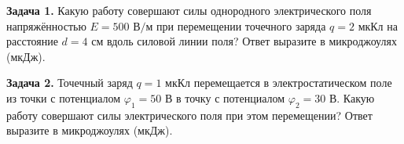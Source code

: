 
\begin{taskbasic}[code={\label{task:elem_pot_v1_n11}}]
\textbf{Задача 1.} Какую работу совершают силы однородного электрического поля напряжённостью $E = 500\text{ В/м}$ при перемещении точечного заряда $q = 2\text{ мкКл}$ на расстояние $d = 4\text{ см}$ вдоль силовой линии поля? Ответ выразите в микроджоулях (мкДж).

\end{taskbasic}

\begin{taskbasic}[code={\label{task:elem_pot_v2_n11}}]
\textbf{Задача 2.} Точечный заряд $q = 1\text{ мкКл}$ перемещается в электростатическом поле из точки с потенциалом $\varphi_1 = 50\text{ В}$ в точку с потенциалом $\varphi_2 = 30\text{ В}$. Какую работу совершают силы электрического поля при этом перемещении? Ответ выразите в микроджоулях (мкДж).

\end{taskbasic}

